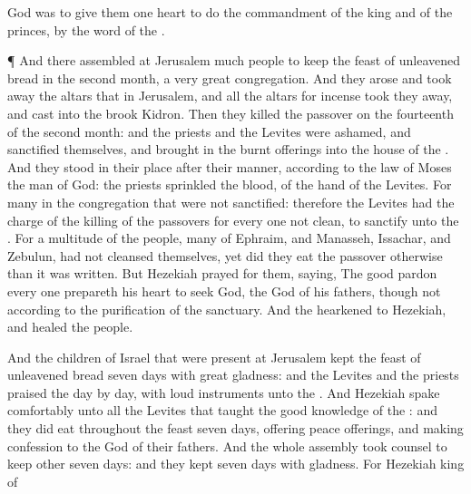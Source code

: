 {God was to
give them
one
heart to
do the
commandment of the
king and of the
princes, by the
word of the
{}.
\par }{\PP {}¶ And there
assembled at
Jerusalem
much
people to
keep the
feast of unleavened
bread in the
second
month, a
very
great
congregation.
And they
arose and took
away the
altars that
{} in
Jerusalem, and all the altars for
incense took they
away, and
cast
{} into the
brook
Kidron.
Then they
killed the
passover on the
fourteenth
{} of the
second
month: and the
priests and the
Levites were
ashamed, and
sanctified themselves, and brought
in the burnt
offerings into the
house of the
{}.
And they
stood in their
place after their
manner, according to the
law of
Moses the
man of
God: the
priests
sprinkled the
blood,
{} of the
hand of the
Levites.
For
{}
many in the
congregation that were not
sanctified: therefore the
Levites had the charge of the
killing of the
passovers for every one
{} not
clean, to
sanctify
{} unto the
{}.
For a
multitude of the
people,
{}
many of
Ephraim, and
Manasseh,
Issachar, and
Zebulun, had
not
cleansed themselves, yet did they
eat the
passover otherwise than it was
written. But
Hezekiah
prayed for them,
saying, The
good
{}
pardon every one
prepareth his
heart to
seek
God, the
{}
God of his
fathers, though
{} not
{} according to the
purification of the
sanctuary.
And the
{}
hearkened to
Hezekiah, and
healed the
people.
\par }{\PP {}And the
children of
Israel that were
present at
Jerusalem
kept the
feast of unleavened
bread
seven
days with
great
gladness: and the
Levites and the
priests
praised the
{}
day by
day,
{} with
loud
instruments unto the
{}.
And
Hezekiah
spake
comfortably unto all the
Levites that
taught the
good
knowledge of the
{}: and they did
eat throughout the
feast
seven
days,
offering
peace
offerings, and making
confession to the
{}
God of their
fathers.
And the whole
assembly took
counsel to
keep
other
seven
days: and they
kept
{}
seven
days with
gladness.
For
Hezekiah
king of
}
